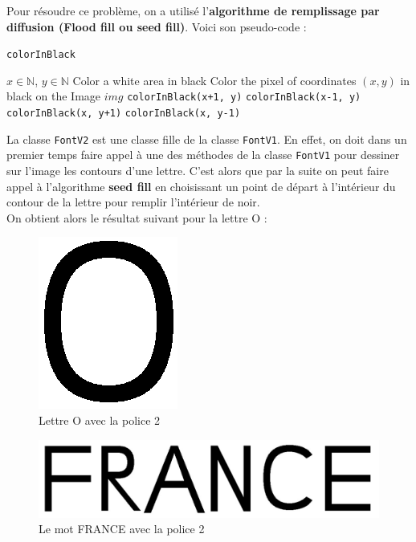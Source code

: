 \documentclass[a4paper, 12pt]{article}
\begin{document}
	Pour résoudre ce problème, on a utilisé l'\textbf{algorithme de remplissage par diffusion (Flood fill ou seed fill)}. Voici son pseudo-code :
 
\begin{algorithm}
	\caption{\texttt{colorInBlack}}
		\begin{algorithmic}[1]
		\Require $x \in \mathbb{N}$, $y \in \mathbb{N}$
		\Ensure Color a white area in black
			\State \Return
		\EndIf
			\State Color the pixel of coordinates $(x, y)$ in black on the Image $img$
			\State \texttt{colorInBlack(x+1, y)} 
			\State \texttt{colorInBlack(x-1, y)} 
			\State \texttt{colorInBlack(x, y+1)} 
			\State \texttt{colorInBlack(x, y-1)} 
		\EndIf	
		\EndFunction
		\end{algorithmic}
\end{algorithm}
\newpage
La classe \texttt{FontV2} est une classe fille de la classe \texttt{FontV1}. En effet, on doit dans un premier temps faire appel à une des méthodes de la classe \texttt{FontV1} pour dessiner sur l'image les contours d'une lettre. C'est alors que par la suite on peut faire appel à l'algorithme \textbf{seed fill} en choisissant un point de départ à l'intérieur du contour de la lettre pour remplir l'intérieur de noir.\\

On obtient alors le résultat suivant pour la lettre O : 

\begin{figure}[h]
\centering
\includegraphics[scale=0.9]{Images/FontV2_O.png}
\caption{Lettre O avec la police 2}
\label{fig5}
\end{figure}

\begin{figure}[h]
\centering
\includegraphics[scale=0.5]{Images/FRANCE_FontV2.jpeg}
\caption{Le mot FRANCE avec la police 2}
\label{fig6}
\end{figure}
\end{document}
